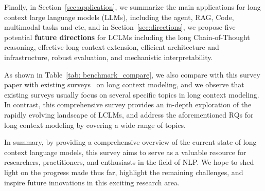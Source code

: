 \documentclass[11pt, a4paper, logo, copyright, nonumbering]{map}
\begin{document}
Finally, in Section~\ref{sec:application}, we summarize the main applications for long context large language models (LLMs), including the agent, RAG, Code, multimodal tasks and etc,
and in Section~\ref{sec:directions}, we propose five potential \textbf{future directions} for LCLMs including the long Chain-of-Thought reasoning, effective long context extension, efficient architecture and infrastructure, robust evaluation, and mechanistic interpretability.







    
    
    



    


As shown in Table~\ref{tab: benchmark_compare},
we also compare with this survey paper with existing surveys~\citep{Liu2025ThusSL, DBLP:journals/corr/abs-2302-14502, DBLP:journals/corr/abs-2401-07872} on long context modeling,
and we observe that existing surveys usually focus on several specific topics in long context modeling.
In contrast, 
this comprehensive survey provides an in-depth exploration of the rapidly evolving landscape of LCLMs,
and address the aforementioned RQs for long context modeling by covering a wide range of topics.


In summary, by providing a comprehensive overview of the current state of long context language models, this survey aims to serve as a valuable resource for researchers, practitioners, and enthusiasts in the field of NLP. We hope to shed light on the progress made thus far, highlight the remaining challenges, and inspire future innovations in this exciting research area.
\end{document}
